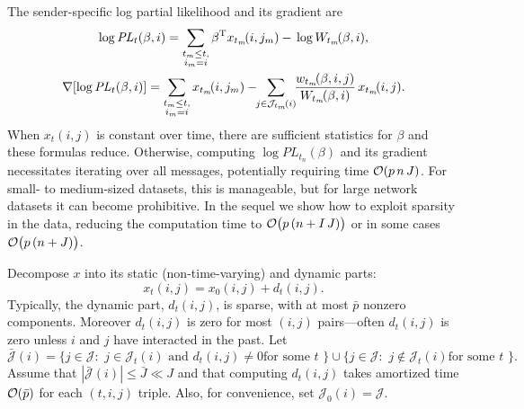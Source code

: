 \documentclass[final]{statsoc}
\begin{document}
The sender-specific log partial likelihood and its gradient are
\begin{gather*}
    \log \mathit{PL}_t(\beta, i)
        =
        \sum_{\substack{t_m \leq t, \\ i_m = i}}
            \beta^\trans
            x_{t_m}\!(i, j_m)
            -
            \,
            \log W_{t_m}\!(\beta, i), \\
    \nabla [ \log \mathit{PL}_t(\beta, i) ]
        =
        \sum_{\substack{t_m \leq t, \\ i_m = i}}
            x_{t_m}\!(i,j_m)
            -\!\!
            \sum_{j \in \mathcal{J}_{t_m}\!(i)}\!\!
                \frac{w_{t_m}\!(\beta,i,j)}{W_{t_m}\!(\beta,i)}
                \,
                x_{t_m}\!(i,j).
\end{gather*}
When $x_t(i,j)$ is constant over time,
there are sufficient statistics for $\beta$ and these formulas reduce.
Otherwise, computing
$\log \mathit{PL}_{t_n}(\beta)$ and its gradient
necessitates iterating over all messages, potentially requiring time
$\mathcal{O}(p \, n \, J)$.  For small- to medium-sized datasets, this is manageable,
but for large network datasets it can become
prohibitive.  In the sequel we show how to exploit sparsity
in the data, reducing the computation time to
$\mathcal{O}\big(p \, (n + I \, J)\big)$ or in some cases
$\mathcal{O}\big(p \, (n + J)\big)$.

Decompose $x$ into its static (non-time-varying) and dynamic parts:
\begin{equation}\label{E:x-static-dynamic}
    x_t(i,j)
        = x_0(i,j) + d_t(i,j).
\end{equation}
Typically, the dynamic part, $d_t(i,j)$, is sparse, with at most $\bar p$
nonzero components.  Moreover $d_t(i,j)$ is zero for most $(i,j)$
pairs---often $d_t(i,j)$ is zero unless $i$ and $j$ have interacted in
the past.  Let
\begin{equation*}
    \mathcal{\bar J}(i)
        =
            \{
                j \in \mathcal{J} :
                \text{
                    $j \in \mathcal{J}_t(i)$ and $d_t(i,j) \neq 0$
                    for some $t$
                }
            \}
        \cup
            \{
                j \in \mathcal{J} :
                \text{
                    $j \notin \mathcal{J}_t(i)$
                    for some $t$
                }
            \}.
\end{equation*}
Assume that $|\mathcal{\bar J}(i)| \le \bar J \ll J$ and that
computing $d_t(i,j)$ takes amortized time $\mathcal{O}(\bar p)$ for each
$(t,i,j)$ triple.  Also, for convenience, set
$\mathcal{J}_0(i) = \mathcal{J}$.
\end{document}
